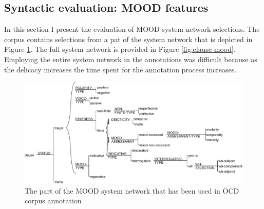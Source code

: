 \subsection{Syntactic evaluation: MOOD features}
\label{sec:syntactic-features}
In this section I present the evaluation of MOOD system network selections. The corpus contains selections from a pat of the system network that is depicted in Figure \ref{fig:mood-ocd-simplified}. The full system network is provided in Figure \ref{fig:clause-mood}. Employing the entire system network in the annotations was difficult because as the delicacy increases the time spent for the annotation process increases. 

\begin{figure}[!ht]
    \centering
    \includegraphics[width=.65\textwidth]{Figures/Evaluation/ocd1-mood-simplified.pdf}
    \caption{The part of the MOOD system network that has been used in OCD corpus annotation}
    \label{fig:mood-ocd-simplified}
\end{figure}

